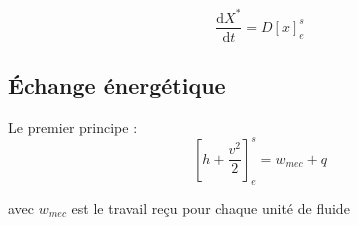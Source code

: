 \begin{equation}
  \frac{\mathrm{d}X ^{*}}{ \mathrm{d}t}  = D [x] _{e} ^{s}
\end{equation}

\subsection{Échange énergétique} %
\label{sub:Échange énergétique}

Le premier principe : 
\begin{equation}
  \left[ h + \frac{v ^{2}}{2}  \right] _{e} ^{s} = w _{mec} + q
\end{equation}

avec $w _{mec}$ est le travail reçu pour chaque unité de fluide

